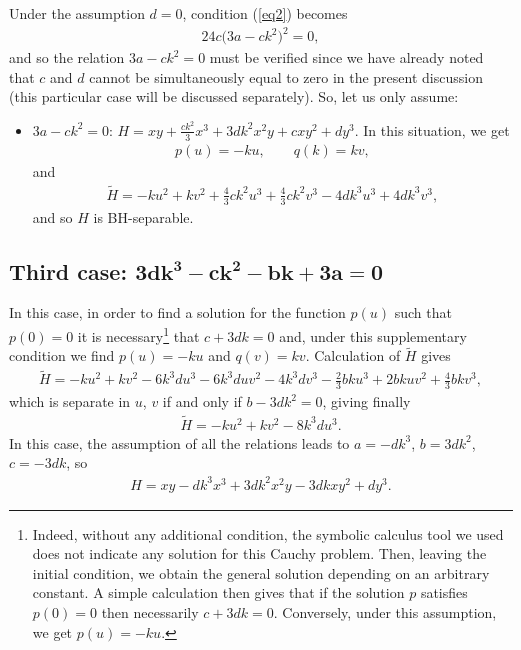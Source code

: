 \documentclass[pdftex]{sigma}%
\numberwithin{equation}{section}
\begin{document}
Under the assumption $d=0$, condition (\ref{eq2}) becomes
\begin{gather*}%
24c\big(3a-ck^2\big)^2=0,
\end{gather*}
and so the relation $3a-ck^2=0$ must be verified since we have already noted that $c$ and $d$ cannot be simultaneously equal to zero in the present discussion (this particular case will be discussed separately). So, let us only assume:
\begin{itemize}\itemsep=0pt
\item $3a-ck^2=0$: $H=xy+\frac{ck^2}{3}x^3+3dk^2x^2y+cxy^2+dy^3$.
In this situation, we get
\begin{gather*}
p(u)=-ku,\qquad q(k)=kv,
\end{gather*}
and
\begin{gather*}
\widetilde{H}=-ku^2+kv^2+\frac{4}{3}ck^2u^3+\frac{4}{3}ck^2v^3-4dk^3u^3+4dk^3v^3,
\end{gather*}
and so $H$ is BH-separable.
\end{itemize}

\subsection*{Third case: $\boldsymbol{3dk^3-ck^2-bk+3a=0}$}

In this case, in order to find a solution for the function $p(u)$ such that $p(0)=0$ it is necessary\footnote{Indeed, without any additional condition, the symbolic calculus tool we used does not indicate any solution for this Cauchy problem. Then, leaving the initial condition, we obtain the general solution depending on an arbitrary constant. A simple calculation then gives that if the solution $p$ satisfies $p(0)=0$ then necessarily $c+3dk=0$. Conversely, under this assumption, we get $p(u)=-ku$.} that $c+3dk=0$ and, under this supplementary condition we find $p(u)=-ku$ and $q(v)=kv$. Calculation of $\widetilde{H}$ gives
\begin{gather*}
\widetilde{H}=-ku^2+kv^2-6k^3du^3-6k^3duv^2-4k^3dv^3-\frac{2}{3}bku^3+2bkuv^2+\frac{4}{3}bkv^3,
\end{gather*}
which is separate in $u$, $v$ if and only if $b-3dk^2=0$, giving finally
\begin{gather*}
\widetilde{H}=-ku^2+kv^2-8k^3du^3.
\end{gather*}
In this case, the assumption of all the relations leads to
$a=-dk^3$, $b=3dk^2$, $c=-3dk$, so
\begin{gather*}
H=xy-dk^3x^3+3dk^2x^2y-3dkxy^2+dy^3.
\end{gather*}
\end{document}
